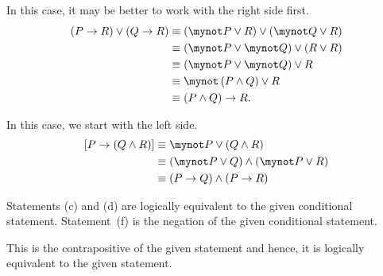 \begin{list}{\bf{\ref{exer:sec23-7}.}}
\item \begin{list}{\bf{(a)}}
\item In this case, it may be better to work with the right side first.
\begin{align*}
\left( {P \to R} \right) \vee \left( {Q \to R} \right) &\equiv 
\left( \mynot P \vee R \right) \vee \left( \mynot Q \vee R \right) \\
&\equiv 
\left( \mynot P \vee \mynot Q \right) \vee \left( R \vee R \right) \\
&\equiv 
\left( \mynot P \vee \mynot Q \right) \vee R \\
&\equiv 
\mynot \left( P \wedge Q \right) \vee R \\
&\equiv \left( P \wedge Q \right) \to R.
\end{align*}
\end{list}
\end{list}

\begin{list}{}
\item \begin{list}{\bf{(b)}}
\item In this case, we start with the left side.
\begin{align*}
\left[ P \to \left( Q \wedge R \right) \right] &\equiv \mynot P \vee \left( Q \wedge R \right) \\
              &\equiv \left( \mynot P \vee Q \right) \wedge \left( \mynot P \vee R \right) \\
              &\equiv \left( P \to Q \right) \wedge \left( P \to R \right)
\end{align*}
\end{list}
\end{list}



\begin{list}{\bf{\ref{exer:diffimpliescont}.}}
\item Statements (c) and (d) are logically equivalent to the given conditional statement.  
Statement~(f) is the negation of the given conditional statement.
\end{list}


\begin{list}{\bf{\ref{exer:sec23-10}.}}
\item \begin{list}{\bf{(d)}}
\item This is the contrapositive of the given statement and hence, it is logically equivalent to the given statement.
\end{list}
\end{list}
\hbreak
